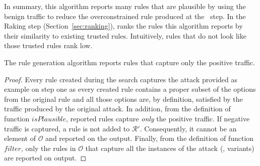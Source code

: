 \documentclass[sigconf,review, anonymous]{acmart}
\begin{document}
In summary, this algorithm reports many rules that are plausible by
using the benign traffic to reduce the overconstrained rule produced
at the \reveng\ step. In the Raking step (Section~\ref{sec:ranking}),
\tname{} ranks the rules this algorithm reports by their similarity to
existing trusted rules. Intuitively, rules that do not look like those
trusted rules rank low.

\begin{proposition}
  \vspace{-1ex}  
  The rule generation algorithm reports rules that capture only the
  positive traffic.
\end{proposition}
\begin{proof}
  \vspace{-1.5ex} Every rule created during the search captures the
  attack provided as example on step one as every created rule
  contains a proper subset of the options from the original rule and
  all those options are, by definition, satisfied by the traffic
  produced by the original attack. In addition, from the definition of
  function $\mathit{isPlausible}$, reported rules capture \emph{only}
  the positive traffic. If negative traffic is captured, a rule is not
  added to $\mathcal R'$. Consequently, it cannot be an element of
  $\mathcal O$ and reported on the output. Finally, from the
  definition of function $\mathit{filter}$, only the rules in
  $\mathcal O$ that capture all the instances of the attack (\ie{},
  variants) are reported on output.
  \vspace{-1ex}    
\end{proof}



\end{document}
